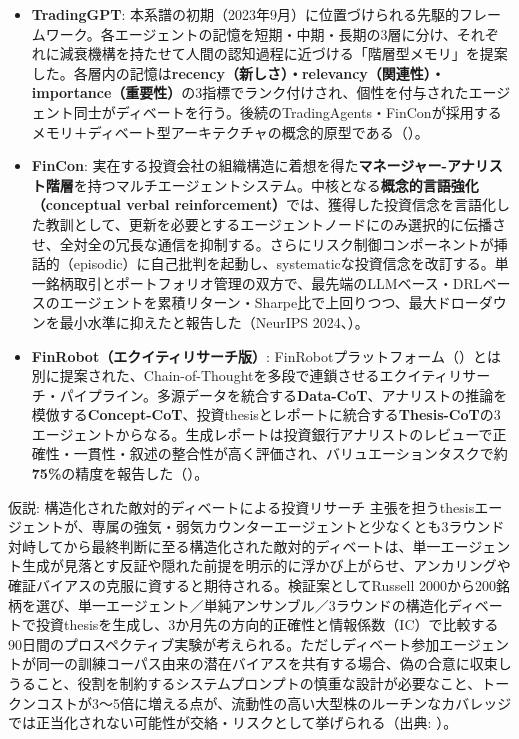 \begin{itemize}
  \item \textbf{TradingGPT}: 本系譜の初期（2023年9月）に位置づけられる先駆的フレームワーク。各エージェントの記憶を短期・中期・長期の3層に分け、それぞれに減衰機構を持たせて人間の認知過程に近づける「階層型メモリ」を提案した。各層内の記憶は\textbf{recency（新しさ）・relevancy（関連性）・importance（重要性）}の3指標でランク付けされ、個性を付与されたエージェント同士がディベートを行う。後続のTradingAgents・FinConが採用するメモリ＋ディベート型アーキテクチャの概念的原型である（\cite{x04tradinggpt2023}）。
  \item \textbf{FinCon}: 実在する投資会社の組織構造に着想を得た\textbf{マネージャー-アナリスト階層}を持つマルチエージェントシステム。中核となる\textbf{概念的言語強化（conceptual verbal reinforcement）}では、獲得した投資信念を言語化した教訓として、更新を必要とするエージェントノードにのみ選択的に伝播させ、全対全の冗長な通信を抑制する。さらにリスク制御コンポーネントが挿話的（episodic）に自己批判を起動し、systematicな投資信念を改訂する。単一銘柄取引とポートフォリオ管理の双方で、最先端のLLMベース・DRLベースのエージェントを累積リターン・Sharpe比で上回りつつ、最大ドローダウンを最小水準に抑えたと報告した（NeurIPS 2024、\cite{x04fincon2024}）。
  \item \textbf{FinRobot（エクイティリサーチ版）}: FinRobotプラットフォーム（\cite{finrobot2024}）とは別に提案された、Chain-of-Thoughtを多段で連鎖させるエクイティリサーチ・パイプライン。多源データを統合する\textbf{Data-CoT}、アナリストの推論を模倣する\textbf{Concept-CoT}、投資thesisとレポートに統合する\textbf{Thesis-CoT}の3エージェントからなる。生成レポートは投資銀行アナリストのレビューで正確性・一貫性・叙述の整合性が高く評価され、バリュエーションタスクで約\textbf{75\%}の精度を報告した（\cite{x04finrobotequity2024}）。
\end{itemize}

\begin{insight}{仮説: 構造化された敵対的ディベートによる投資リサーチ}
主張を担うthesisエージェントが、専属の強気・弱気カウンターエージェントと少なくとも3ラウンド対峙してから最終判断に至る構造化された敵対的ディベートは、単一エージェント生成が見落とす反証や隠れた前提を明示的に浮かび上がらせ、アンカリングや確証バイアスの克服に資すると期待される。検証案としてRussell 2000から200銘柄を選び、単一エージェント／単純アンサンブル／3ラウンドの構造化ディベートで投資thesisを生成し、3か月先の方向的正確性と情報係数（IC）で比較する90日間のプロスペクティブ実験が考えられる。ただしディベート参加エージェントが同一の訓練コーパス由来の潜在バイアスを共有する場合、偽の合意に収束しうること、役割を制約するシステムプロンプトの慎重な設計が必要なこと、トークンコストが3〜5倍に増える点が、流動性の高い大型株のルーチンなカバレッジでは正当化されない可能性が交絡・リスクとして挙げられる（出典: \cite{multiagentdebate2025}）。
\end{insight}

